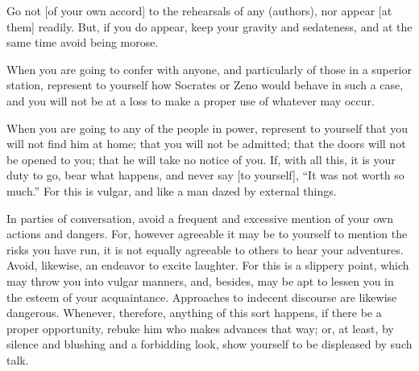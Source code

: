 Go not [of your own accord] to  the rehearsals of any (authors), nor appear [at
them] readily. But, if you do appear,  keep your gravity and sedateness, and at
the same time avoid being morose.

When  you are  going to  confer with  anyone, and  particularly of  those in  a
superior station,  represent to yourself how  Socrates or Zeno would  behave in
such a case, and you will not be at a loss to make a proper use of whatever may
occur.

When you are  going to any of  the people in power, represent  to yourself that
you will not  find him at home; that  you will not be admitted;  that the doors
will not  be opened to you;  that he will take  no notice of you.  If, with all
this, it is  your duty to go,  bear what happens, and never  say [to yourself],
``It was  not worth  so much.'' For  this is  vulgar, and like  a man  dazed by
external things.

In parties of conversation, avoid a  frequent and excessive mention of your own
actions and  dangers. For, however agreeable  it may be to  yourself to mention
the risks  you have run,  it is  not equally agreeable  to others to  hear your
adventures. Avoid,  likewise, an  endeavor to  excite laughter.  For this  is a
slippery point, which  may throw you into vulgar manners,  and, besides, may be
apt to  lessen you in the  esteem of your acquaintance.  Approaches to indecent
discourse are  likewise dangerous. Whenever,  therefore, anything of  this sort
happens, if there  be a proper opportunity, rebuke him  who makes advances that
way; or, at least, by silence and blushing and a forbidding look, show yourself
to be displeased by such talk.
